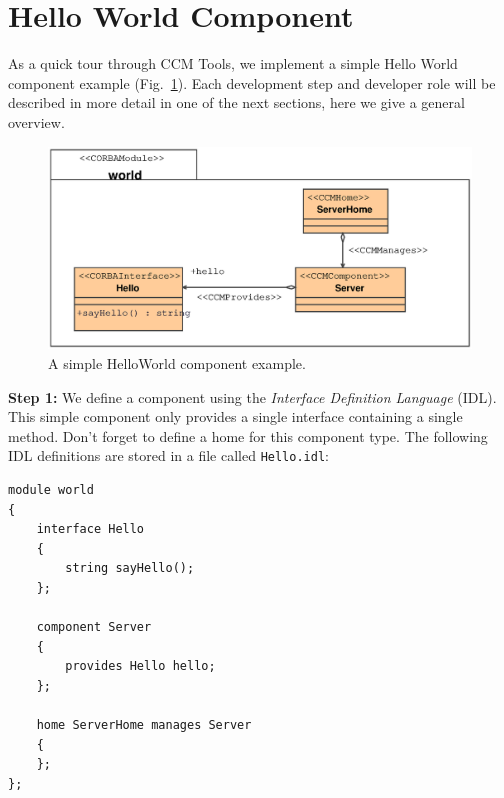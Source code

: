 \section{Hello World Component}
\label{HelloWorldComponent}

As a quick tour through CCM Tools, we implement a simple Hello World 
component example (Fig.~\ref{fig:uml-helloworld}). 
Each development step and developer role will be described 
in more detail in one of the next sections, here we give a general overview.

\begin{figure}[htb]
    \begin{center}
        \includegraphics [width=12cm,angle=0] {uml/Hello.eps}
        \caption{A simple HelloWorld component example.}
        \label{fig:uml-helloworld}
    \end{center}
\end{figure}

\vspace{3mm}
\noindent
{\bf Step 1:} We define a component using the 
{\it Interface Definition Language} (IDL). 
This simple component only provides a single interface containing a single
method. Don't forget to define a home for this component type.
The following IDL definitions are stored in
a file called {\tt Hello.idl}:
\begin{small}
\begin{verbatim}
module world
{ 
    interface Hello 
    { 
        string sayHello(); 
    }; 

    component Server 
    { 
        provides Hello hello;
    }; 

    home ServerHome manages Server
    {
    };
};
\end{verbatim}
\end{small}


